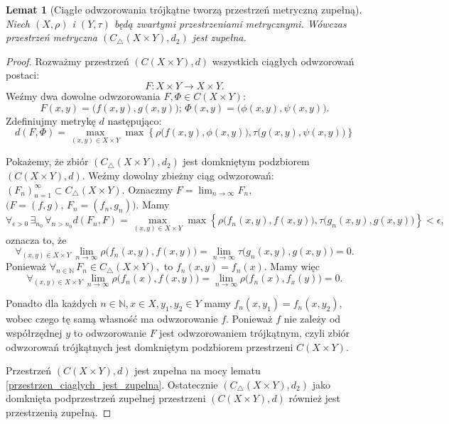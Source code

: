 \documentclass[licencjacka]{pwr_wmat_praca_dyplomowa}
\theoremstyle{plain}
\numberwithin{theorem}{chapter}
\newtheorem{lemma}[theorem]{Lemat}
\theoremstyle{definition}
\numberwithin{theorem}{chapter}
\begin{document}
\begin{lemma}[Ciągłe odwzorowania trójkątne tworzą przestrzeń metryczną zupełną]
\label{ciagle_trojkatne_tworza_przestrzen_metryczna_zupelna}
Niech $(X, \rho)$ i $(Y, \tau)$ będą zwartymi przestrzeniami metrycznymi.
Wówczas przestrzeń metryczna $(C_\triangle(X \times Y), d_2)$ jest zupełna.
\end{lemma}

\begin{proof}
Rozważmy przestrzeń $(C(X \times Y), d)$ wszystkich ciągłych odwzorowań postaci: 
$$F: X \times Y \rightarrow X \times Y.$$ 
Weźmy dwa dowolne odwzorowania $F, \Phi \in C(X \times Y)$: 
$$F(x,y) = \big(f(x,y), g(x,y)\big); \, \Phi(x,y) = \big(\phi(x,y), \psi(x,y)\big).$$
Zdefiniujmy metrykę $d$ następująco:
$$d(F, \Phi) = \max_{(x,y) \in X \times Y} \max \left\{ \rho\big(f(x,y), \phi(x,y)\big), \tau\big(g(x,y), \psi(x,y)\big) \right\}$$ 


Pokażemy, że zbiór $(C_\triangle(X \times Y), d_2)$ jest domkniętym podzbiorem $(C(X \times Y), d).$ Weźmy dowolny zbieżny ciąg odwzorowań: $(F_n)_{n=1}^{\infty} \subset C_\triangle(X \times Y).$ Oznaczmy $F = \lim_{n \rightarrow \infty} F_n,$ $\big(F=(f,g), \, F_n=(f_n, g_n)\big).$
Mamy 
$$\forall_{\epsilon > 0} \, \exists_{n_0} \, \forall_{n > n_0} d(F_n, F) = \max_{(x,y) \in X \times Y} \max \left\{ \rho\big(f_n(x,y), f(x,y)\big), \tau\big(g_n(x,y), g(x,y)\big) \right\} < \epsilon,$$
oznacza to, że 
$$\forall_{(x,y) \in X \times Y} \, \lim_{n \rightarrow \infty} \rho\big(f_n(x,y), f(x,y)\big) = \lim_{n \rightarrow \infty} \tau\big(g_n(x,y), g(x,y)\big) = 0.$$
Ponieważ $\forall_{n \in \mathbb{N}} \, F_n \in C_\triangle(X \times Y),$ to $f_n(x,y) = f_n(x).$ 
Mamy więc 
$$\forall_{(x,y) \in X \times Y} \, \lim_{n \rightarrow \infty} \rho\big(f_n(x), f(x,y)\big) = \lim_{n \rightarrow \infty} \rho\big(f_n(x), f_x(y)\big) = 0.$$

Ponadto dla każdych $n \in \mathbb{N}, x \in X, y_1, y_2 \in Y$ mamy $f_n(x, y_1) = f_n(x, y_2),$ wobec czego tę samą własność ma odwzorowanie $f.$ Ponieważ $f$ nie zależy od współrzędnej $y$ to odwzorowanie $F$ jest odwzorowaniem trójkątnym, czyli zbiór odwzorowań trójkątnych jest domkniętym podzbiorem przestrzeni $C(X \times Y).$

Przestrzeń $(C(X \times Y), d)$ jest zupełna na mocy lematu \ref{przestrzen_ciaglych_jest_zupelna}. Ostatecznie $(C_\triangle(X \times Y), d_2)$ jako domknięta podprzestrzeń zupełnej przestrzeni $(C(X \times Y), d)$ również jest przestrzenią zupełną.
\end{proof}
\end{document}
